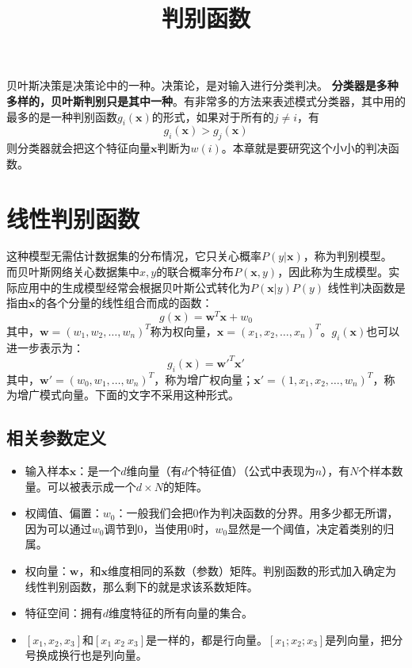 \documentclass[12pt, letterpaper]{article}
\title{判别函数}
\begin{document}
\maketitle
\tableofcontents
\newpage
贝叶斯决策是决策论中的一种。决策论，是对输入进行分类判决。
\textbf{分类器是多种多样的，贝叶斯判别只是其中一种}。有非常多的方法来表述模式分类器，其中用的最多的是一种判别函数$g_i(\mathbf{x})$的形式，如果对于所有的$j\neq i$，有
\begin{equation}
g_i(\mathbf{x})>g_j(\mathbf{x})
\end{equation}
则分类器就会把这个特征向量$\mathbf{x}$判断为$w(i)$。本章就是要研究这个小小的判决函数。
\section{线性判别函数}
这种模型无需估计数据集的分布情况，它只关心概率$P(y|\mathbf{x})$，称为判别模型。
而贝叶斯网络关心数据集中$x,y$的联合概率分布$P(\mathbf{x},y)$，因此称为生成模型。实际应用中的生成模型经常会根据贝叶斯公式转化为$P(\mathbf{x}|y)P(y)$
线性判决函数是指由$\mathbf{x}$的各个分量的线性组合而成的函数：
\begin{equation}
g(\mathbf{x})=\mathbf{w}^T\mathbf{x}+w_0
\end{equation}
其中，$\mathbf{w}=(w_1,w_2,\ldots,w_n)^T$称为权向量，$\mathbf{x}=(x_1,x_2,\ldots,x_n)^T$。$g_i(\mathbf{x})$也可以进一步表示为：
\begin{equation}
g_i(\mathbf{x})=\mathbf{w'}^{T}\mathbf{x'}
\end{equation}
其中，$\mathbf{w'}=(w_0,w_1,\ldots,w_n)^T$，称为增广权向量；$\mathbf{x'}=(1,x_1,x_2,\ldots,w_n)^T$，称为增广模式向量。下面的文字不采用这种形式。
\subsection{相关参数定义}
\begin{itemize}
\item 输入样本$\mathbf{x}$：是一个$d$维向量（有$d$个特征值）（公式中表现为$n$），有$N$个样本数量。可以被表示成一个$d\times N$的矩阵。
\item 权阈值、偏置：$w_0$：一般我们会把$0$作为判决函数的分界。用多少都无所谓，因为可以通过$w_0$调节到$0$，当使用$0$时，$w_0$显然是一个阈值，决定着类别的归属。
\item 权向量：$\mathbf{w}$，和$\mathbf{x}$维度相同的系数（参数）矩阵。判别函数的形式加入确定为线性判别函数，那么剩下的就是求该系数矩阵。
\item 特征空间：拥有$d$维度特征的所有向量的集合。
\item $[x_1,x_2,x_3]$和$[x_1\ x_2\ x_3]$是一样的，都是行向量。$[x_1; x_2; x_3]$是列向量，把分号换成换行也是列向量。
\end{itemize}
\end{document}
